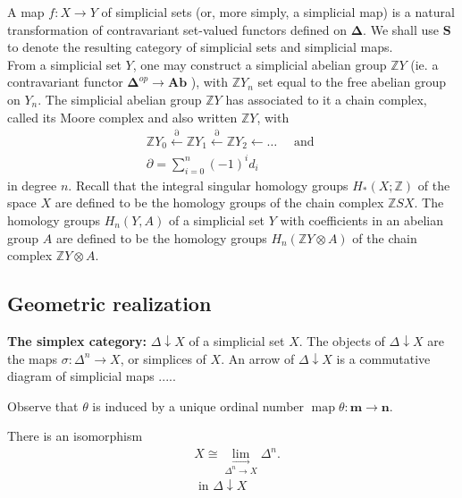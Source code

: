 A map $f: X \rightarrow Y$ of simplicial sets (or, more simply, a simplicial map) is a natural transformation of contravariant set-valued functors defined on $\boldsymbol{\Delta}$. We shall use $\mathbf{S}$ to denote the resulting category of simplicial sets and simplicial maps.\\

From a simplicial set $Y$, one may construct a simplicial abelian group $\mathbb{Z} Y$ (ie. a contravariant functor $\boldsymbol{\Delta}^{o p} \rightarrow \mathbf{A b}$ ), with $\mathbb{Z} Y_n$ set equal to the free abelian group on $Y_n$. The simplicial abelian group $\mathbb{Z} Y$ has associated to it a chain complex, called its Moore complex and also written $\mathbb{Z} Y$, with
$$
\begin{gathered}
\mathbb{Z} Y_0 \stackrel{\partial}{\leftarrow} \mathbb{Z} Y_1 \stackrel{\partial}{\leftarrow} \mathbb{Z} Y_2 \leftarrow \ldots \quad \text { and } \\
\partial=\sum_{i=0}^n(-1)^i d_i
\end{gathered}
$$
in degree $n$. Recall that the integral singular homology groups $H_*(X ; \mathbb{Z})$ of the space $X$ are defined to be the homology groups of the chain complex $\mathbb{Z} S X$. The homology groups $H_n(Y, A)$ of a simplicial set $Y$ with coefficients in an abelian group $A$ are defined to be the homology groups $H_n(\mathbb{Z} Y \otimes A)$ of the chain complex $\mathbb{Z} Y \otimes A$.



\subsection*{Geometric realization}

\textbf{The simplex category:} $\Delta \downarrow X$ of a simplicial set $X$. The objects of $\Delta \downarrow X$ are the maps $\sigma: \Delta^n \rightarrow X$, or simplices of $X$. An arrow of $\Delta \downarrow X$ is a commutative diagram of simplicial maps .....

Observe that $\theta$ is induced by a unique ordinal number $\operatorname{map} \theta: \mathbf{m} \rightarrow \mathbf{n}$.
\begin{lemm} There is an isomorphism
$$
\begin{aligned}
& X \cong \underset{\Delta^n \longrightarrow X}{\lim _{\longrightarrow}} \Delta^n . \\
& \text { in } \Delta \downarrow X \\
&
\end{aligned}
$$
\end{lemm}

